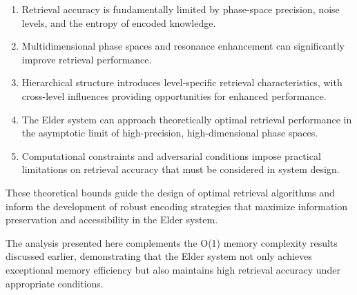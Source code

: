 \begin{enumerate}
    \item Retrieval accuracy is fundamentally limited by phase-space precision, noise levels, and the entropy of encoded knowledge.
    
    \item Multidimensional phase spaces and resonance enhancement can significantly improve retrieval performance.
    
    \item Hierarchical structure introduces level-specific retrieval characteristics, with cross-level influences providing opportunities for enhanced performance.
    
    \item The Elder system can approach theoretically optimal retrieval performance in the asymptotic limit of high-precision, high-dimensional phase spaces.
    
    \item Computational constraints and adversarial conditions impose practical limitations on retrieval accuracy that must be considered in system design.
\end{enumerate}

These theoretical bounds guide the design of optimal retrieval algorithms and inform the development of robust encoding strategies that maximize information preservation and accessibility in the Elder system.

The analysis presented here complements the O(1) memory complexity results discussed earlier, demonstrating that the Elder system not only achieves exceptional memory efficiency but also maintains high retrieval accuracy under appropriate conditions.